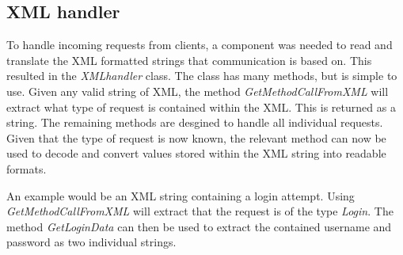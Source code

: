 \subsection{XML handler}
\label{sec:xmlhandlerimpl}
To handle incoming requests from clients, a component was needed to read and translate the XML formatted strings that communication is based on. This resulted in the \textit{XMLhandler} class. The class has many methods, but is simple to use. Given any valid string of XML, the method \textit{GetMethodCallFromXML} will extract what type of request is contained within the XML. This is returned as a string. The remaining methods are desgined to handle all individual requests. Given that the type of request is now known, the relevant method can now be used to decode and convert values stored within the XML string into readable formats.

An example would be an XML string containing a login attempt. Using \textit{GetMethodCallFromXML} will extract that the request is of the type \textit{Login}. The method \textit{GetLoginData} can then be used to extract the contained username and password as two individual strings.